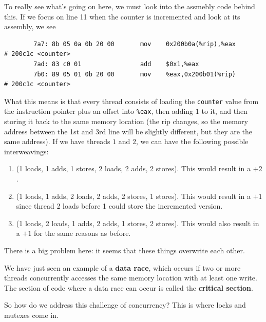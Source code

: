 \documentclass{article}
\newcounter{definition}[section]
\newcounter{example}[section]
\newcounter{code}[section]
\begin{document}
\begin{example}
      To really see what's going on here, we must look into the assmebly code behind this. If we focus on line 11 when the counter is incremented and look at its assembly, we see 
      \begin{lstlisting}
        7a7: 8b 05 0a 0b 20 00       mov    0x200b0a(%rip),%eax        # 200c1c <counter> 
        7ad: 83 c0 01                add    $0x1,%eax 
        7b0: 89 05 01 0b 20 00       mov    %eax,0x200b01(%rip)        # 200c1c <counter> 
      \end{lstlisting}
      What this means is that every thread consists of loading the \texttt{counter} value from the instruction pointer plus an offset into \texttt{\%eax}, then adding $1$ to it, and then storing it back to the same memory location (the rip changes, so the memory address between the 1st and 3rd line will be slightly different, but they are the same address). If we have threads $1$ and $2$, we can have the following possible interweavings: 
      \begin{enumerate}
        \item (1 loads, 1 adds, 1 stores, 2 loads, 2 adds, 2 stores). This would result in a $+2$. 
        \item (1 loads, 1 adds, 2 loads, 2 adds, 2 stores, 1 stores). This would result in a $+1$ since thread 2 loads before 1 could store the incremented version. 
        \item (1 loads, 2 loads, 1 adds, 2 adds, 1 stores, 2 stores). This would also result in a $+1$ for the same reasons as before. 
      \end{enumerate}
    \end{example}


    There is a big problem here: it seems that these things overwrite each other. 

    \begin{definition}
      \label{def:data-race}
      We have just seen an example of a \textbf{data race}, which occurs if two or more threads concurrently accesses the same memory location with at least one write. The section of code where a data race can occur is called the \textbf{critical section}. 
    \end{definition}

    So how do we address this challenge of concurrency? This is where locks and mutexes come in. 
\end{document}
